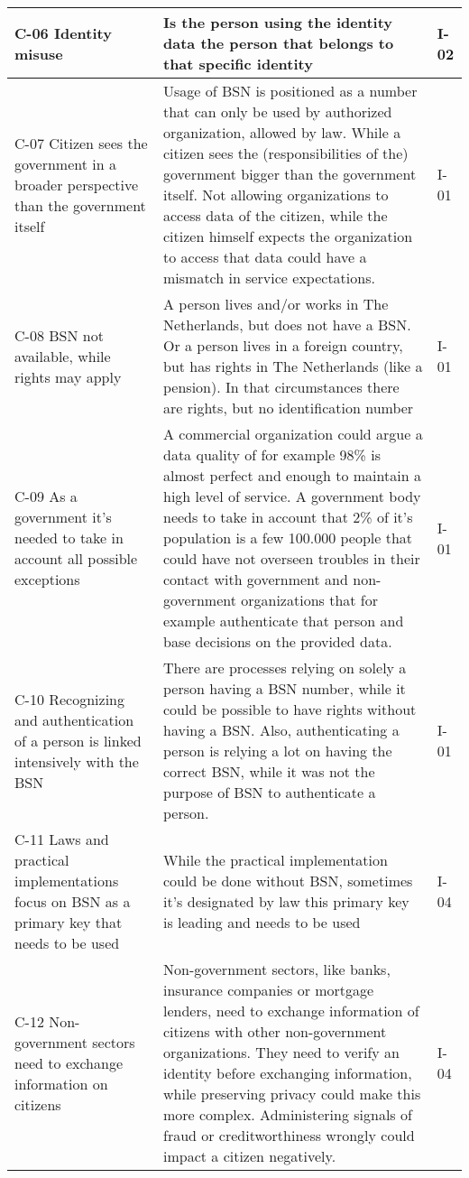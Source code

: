 \begin{longtable}[c]{|p{4cm}|p{8cm}|p{2cm}|}
 \hline
C-06 Identity misuse & Is the person using the identity data the person that belongs to that specific identity & I-02\\
 \hline
C-07 Citizen sees the government in a broader perspective than the government itself & Usage of BSN is positioned as a number that can only be used by authorized organization, allowed by law. While a citizen sees the (responsibilities of the) government bigger than the government itself. Not allowing organizations to access data of the citizen, while the citizen himself expects the organization to access that data could have a mismatch in service expectations. & I-01\\
 \hline
C-08 BSN not available, while rights may apply & A person lives and/or works in The Netherlands, but does not have a BSN. Or a person lives in a foreign country, but has rights in The Netherlands (like a pension). In that circumstances there are rights, but no identification number & I-01\\
 \hline
C-09 As a government it’s needed to take in account all possible exceptions & A commercial organization could argue a data quality of for example 98\% is almost perfect and enough to maintain a high level of service. A government body needs to take in account that 2\% of it's population is a few 100.000 people that could have not overseen troubles in their contact with government and non-government organizations that for example authenticate that person and base decisions on the provided data. & I-01\\
 \hline
C-10 Recognizing and authentication of a person is linked intensively with the BSN & There are processes relying on solely a person having a BSN number, while it could be possible to have rights without having a BSN. Also, authenticating a person is relying a lot on having the correct BSN, while it was not the purpose of BSN to authenticate a person. & I-01 \\
 \hline
C-11 Laws and practical implementations focus on BSN as a primary key that needs to be used & While the practical implementation could be done without BSN, sometimes it's designated by law this primary key is leading and needs to be used & I-04 \\
 \hline
C-12 Non-government sectors need to exchange information on citizens & Non-government sectors, like banks, insurance companies or mortgage lenders, need to exchange information of citizens with other non-government organizations. They need to verify an identity before exchanging information, while preserving privacy could make this more complex. Administering signals of fraud or creditworthiness wrongly could impact a citizen negatively. & I-04 \\
 \end{longtable}


